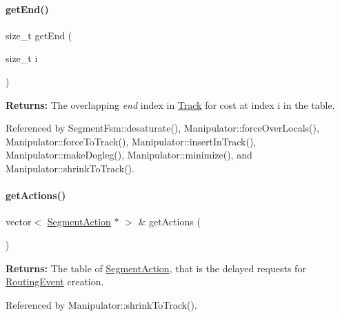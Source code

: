 \mbox{\label{classKite_1_1SegmentFsm_aaf31c0a3018908a2ee26a8ea9e893eb1}} 
\paragraph{\texorpdfstring{get\+End()}{getEnd()}}
{\footnotesize\ttfamily size\+\_\+t get\+End (\begin{DoxyParamCaption}\item[{size\+\_\+t}]{i }\end{DoxyParamCaption})\hspace{0.3cm}{\ttfamily [inline]}}

{\bfseries Returns\+:} The overlapping {\itshape end} index in \hyperlink{classKite_1_1Track}{Track} for cost at index {\ttfamily i} in the table. 

Referenced by Segment\+Fsm\+::desaturate(), Manipulator\+::force\+Over\+Locals(), Manipulator\+::force\+To\+Track(), Manipulator\+::insert\+In\+Track(), Manipulator\+::make\+Dogleg(), Manipulator\+::minimize(), and Manipulator\+::shrink\+To\+Track().

\mbox{\label{classKite_1_1SegmentFsm_ab3b06bb353ee9333be6b937bffc8fd84}} 
\paragraph{\texorpdfstring{get\+Actions()}{getActions()}}
{\footnotesize\ttfamily vector$<$ \hyperlink{classKite_1_1SegmentAction}{Segment\+Action} $\ast$ $>$ \& get\+Actions (\begin{DoxyParamCaption}{ }\end{DoxyParamCaption})\hspace{0.3cm}{\ttfamily [inline]}}

{\bfseries Returns\+:} The table of \hyperlink{classKite_1_1SegmentAction}{Segment\+Action}, that is the delayed requests for \hyperlink{classKite_1_1RoutingEvent}{Routing\+Event} creation. 

Referenced by Manipulator\+::shrink\+To\+Track().

\mbox{\label{classKite_1_1SegmentFsm_adf5147448951f8dc8b4088a1032e97b2}} 
